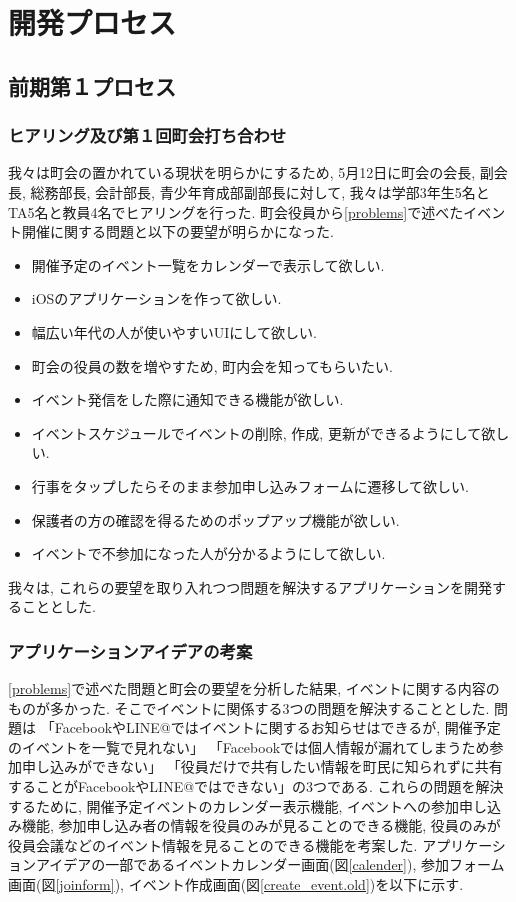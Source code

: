 \chapter{開発プロセス}

\section{前期第１プロセス}

\subsection{ヒアリング及び第１回町会打ち合わせ}
我々は町会の置かれている現状を明らかにするため,
5月12日に町会の会長, 副会長, 総務部長, 会計部長, 青少年育成部副部長に対して,
我々は学部3年生5名とTA5名と教員4名でヒアリングを行った.
町会役員から\ref{problems}で述べたイベント開催に関する問題と以下の要望が明らかになった.

\begin{itemize}
\item 開催予定のイベント一覧をカレンダーで表示して欲しい.
\item iOSのアプリケーションを作って欲しい.
\item 幅広い年代の人が使いやすいUIにして欲しい.
\item 町会の役員の数を増やすため, 町内会を知ってもらいたい.
\item イベント発信をした際に通知できる機能が欲しい.
\item イベントスケジュールでイベントの削除, 作成, 更新ができるようにして欲しい.
\item 行事をタップしたらそのまま参加申し込みフォームに遷移して欲しい.
\item 保護者の方の確認を得るためのポップアップ機能が欲しい.
\item イベントで不参加になった人が分かるようにして欲しい.
\end{itemize}

我々は, これらの要望を取り入れつつ問題を解決するアプリケーションを開発することとした.


\subsection{アプリケーションアイデアの考案}
\ref{problems}で述べた問題と町会の要望を分析した結果, イベントに関する内容のものが多かった.
そこでイベントに関係する3つの問題を解決することとした. 問題は
「FacebookやLINE@ではイベントに関するお知らせはできるが, 開催予定のイベントを一覧で見れない」
「Facebookでは個人情報が漏れてしまうため参加申し込みができない」
「役員だけで共有したい情報を町民に知られずに共有することがFacebookやLINE@ではできない」の3つである.
これらの問題を解決するために, 開催予定イベントのカレンダー表示機能,
イベントへの参加申し込み機能, 参加申し込み者の情報を役員のみが見ることのできる機能,
役員のみが役員会議などのイベント情報を見ることのできる機能を考案した.
アプリケーションアイデアの一部であるイベントカレンダー画面(図\ref{calender}),
参加フォーム画面(図\ref{joinform}), イベント作成画面(図\ref{create_event.old})を以下に示す.

